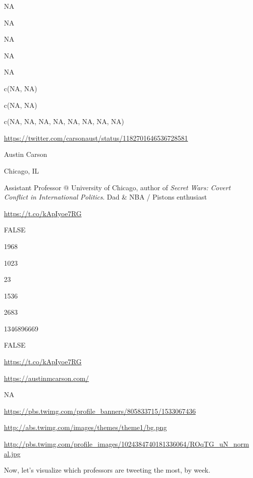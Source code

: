 \documentclass[]{book}
\newenvironment{Shaded}{\begin{snugshade}}{\end{snugshade}}
\newcommand{\KeywordTok}[1]{\textcolor[rgb]{0.13,0.29,0.53}{\textbf{#1}}}
\newcommand{\DataTypeTok}[1]{\textcolor[rgb]{0.13,0.29,0.53}{#1}}
\newcommand{\StringTok}[1]{\textcolor[rgb]{0.31,0.60,0.02}{#1}}
\newcommand{\OperatorTok}[1]{\textcolor[rgb]{0.81,0.36,0.00}{\textbf{#1}}}
\newcommand{\NormalTok}[1]{#1}
\begin{document}
NA

NA

NA

NA

NA

c(NA, NA)

c(NA, NA)

c(NA, NA, NA, NA, NA, NA, NA, NA)

\url{https://twitter.com/carsonaust/status/1182701646536728581}

Austin Carson

Chicago, IL

Assistant Professor @ University of Chicago, author of \emph{Secret
Wars: Covert Conflict in International Politics}. Dad \& NBA / Pistons
enthusiast

\url{https://t.co/kApIyoe7RG}

FALSE

1968

1023

23

1536

2683

1346896669

FALSE

\url{https://t.co/kApIyoe7RG}

\url{https://austinmcarson.com/}

NA

\url{https://pbs.twimg.com/profile_banners/805833715/1533067436}

\url{http://abs.twimg.com/images/themes/theme1/bg.png}

\url{http://pbs.twimg.com/profile_images/1024384740181336064/ROqTG_uN_normal.jpg}

Now, let's visualize which professors are tweeting the most, by week.

\begin{Shaded}
\end{Shaded}
\end{document}
